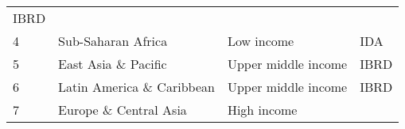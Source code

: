 \documentclass[
]{article}
\begin{document}
\begin{longtable}[]{@{}llll@{}}
\begin{minipage}[t]{0.16\columnwidth}
IBRD\strut
\end{minipage}\tabularnewline
\begin{minipage}[t]{0.06\columnwidth}\raggedright
4\strut
\end{minipage} & \begin{minipage}[t]{0.17\columnwidth}\raggedright
Sub-Saharan Africa\strut
\end{minipage} & \begin{minipage}[t]{0.11\columnwidth}\raggedright
Low income\strut
\end{minipage} & \begin{minipage}[t]{0.16\columnwidth}\raggedright
IDA\strut
\end{minipage}\tabularnewline
\begin{minipage}[t]{0.06\columnwidth}\raggedright
5\strut
\end{minipage} & \begin{minipage}[t]{0.17\columnwidth}\raggedright
East Asia \& Pacific\strut
\end{minipage} & \begin{minipage}[t]{0.11\columnwidth}\raggedright
Upper middle income\strut
\end{minipage} & \begin{minipage}[t]{0.16\columnwidth}\raggedright
IBRD\strut
\end{minipage}\tabularnewline
\begin{minipage}[t]{0.06\columnwidth}\raggedright
6\strut
\end{minipage} & \begin{minipage}[t]{0.17\columnwidth}\raggedright
Latin America \& Caribbean\strut
\end{minipage} & \begin{minipage}[t]{0.11\columnwidth}\raggedright
Upper middle income\strut
\end{minipage} & \begin{minipage}[t]{0.16\columnwidth}\raggedright
IBRD\strut
\end{minipage}\tabularnewline
\begin{minipage}[t]{0.06\columnwidth}\raggedright
7\strut
\end{minipage} & \begin{minipage}[t]{0.17\columnwidth}\raggedright
Europe \& Central Asia\strut
\end{minipage} & \begin{minipage}[t]{0.11\columnwidth}\raggedright
High income\strut
\end{minipage} & \begin{minipage}[t]{0.16\columnwidth}\raggedright

\end{minipage}
\end{longtable}
\end{document}
